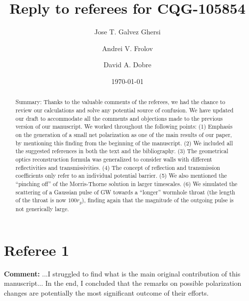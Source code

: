 \documentclass[preprintnumbers,floats,floatfix,amssymb,prd,onecolumn,superscriptaddress,nofootinbib]{revtex4}
\begin{document}
\title{Reply to referees for CQG-105854}

\author{Jose T. Galvez Ghersi}%

\author{Andrei V. Frolov}

\author{David A. Dobre}
\date{\today}

\begin{abstract} 
Summary: Thanks to the valuable comments of the referees, we had the chance to review our calculations and solve any potential source of confusion. We have updated our draft to accommodate all the comments and objections made to the previous version of our manuscript. We worked throughout the following points: (1) Emphasis on the generation of a small net polarization as one of the main results of our paper, by mentioning this finding from the beginning of the manuscript. (2) We included all the suggested references in both the text and the bibliography. (3) The geometrical optics reconstruction formula was generalized to consider walls with different reflectivities and transmissivities. (4) The concept of reflection and transmission coefficients only refer to an individual potential barrier. (5) We also mentioned the ``pinching off'' of the Morris-Thorne solution in larger timescales. (6) We simulated the scattering of a Gaussian pulse of GW towards a ``longer'' wormhole throat (the length of the throat is now $100 r_g$), finding again that the magnitude of the outgoing pulse is not generically large. 
\end{abstract}
\maketitle

\section{Referee 1}

\textbf{Comment:} ...I struggled to find what is the main original contribution of this manuscript... In the end, I concluded that the remarks on possible polarization changes are potentially the most significant outcome of their efforts.\\
\end{document}
